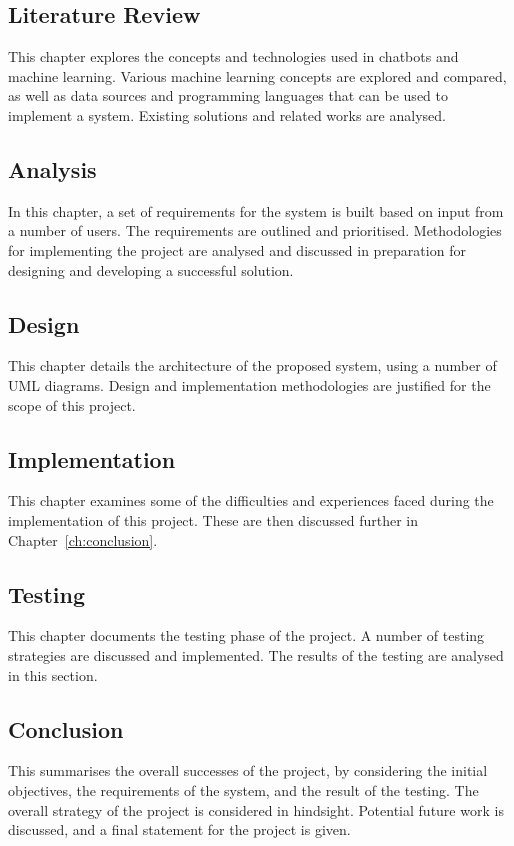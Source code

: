 \subsection*{Literature Review}
This chapter explores the concepts and technologies used in chatbots and machine learning. Various machine learning concepts are explored and compared, as well as data sources and programming languages that can be used to implement a system. Existing solutions and related works are analysed.

\subsection*{Analysis}
In this chapter, a set of requirements for the system is built based on input from a number of users. The requirements are outlined and prioritised. Methodologies for implementing the project are analysed and discussed in preparation for designing and developing a successful solution.

\subsection*{Design}
This chapter details the architecture of the proposed system, using a number of UML diagrams. Design and implementation methodologies are justified for the scope of this project.

\subsection*{Implementation}
This chapter examines some of the difficulties and experiences faced during the implementation of this project. These are then discussed further in Chapter~\ref{ch:conclusion}.

\subsection*{Testing}
This chapter documents the testing phase of the project. A number of testing strategies are discussed and implemented. The results of the testing are analysed in this section.

\subsection*{Conclusion}
This summarises the overall successes of the project, by considering the initial objectives, the requirements of the system, and the result of the testing. The overall strategy of the project is considered in hindsight. Potential future work is discussed, and a final statement for the project is given.


